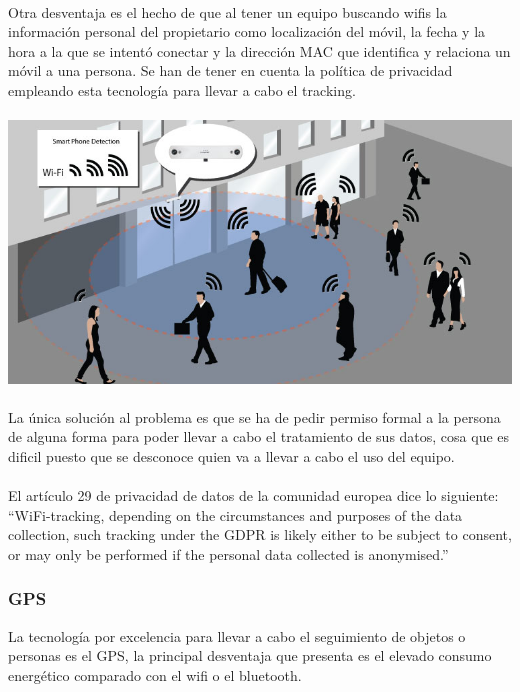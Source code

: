 \documentclass[a4paper ,12pt, onecolumn]{article}
\begin{document}
            \paragraph{}
            Otra desventaja es el hecho de que al tener un equipo buscando wifis la información personal del propietario como localización del móvil,
            la fecha y la hora a la que se intentó conectar y la dirección MAC que identifica y relaciona un móvil a una persona. Se han de tener 
            en cuenta la política de privacidad empleando esta tecnología para llevar a cabo el tracking.
            \paragraph{}
            \includegraphics[scale=0.4]{WifiCounting.jpg}
            \paragraph{}
            La única solución al problema es que se ha de pedir permiso formal a la persona de alguna forma para poder llevar a cabo
            el tratamiento de sus datos, cosa que es dificil puesto que se desconoce quien va a llevar a cabo el uso del equipo.
            \paragraph{}
            El artículo 29 de privacidad de datos de la comunidad europea dice lo siguiente:
            “WiFi-tracking, depending on the circumstances and purposes of the data collection, such tracking under the GDPR is likely
            either to be subject to consent, or may only be performed if the personal data collected is anonymised.”
        \subsubsection {GPS}
            La tecnología por excelencia para llevar a cabo el seguimiento de objetos o personas es el GPS, la principal desventaja
            que presenta es el elevado consumo energético comparado con el wifi o el bluetooth.
\end{document}
